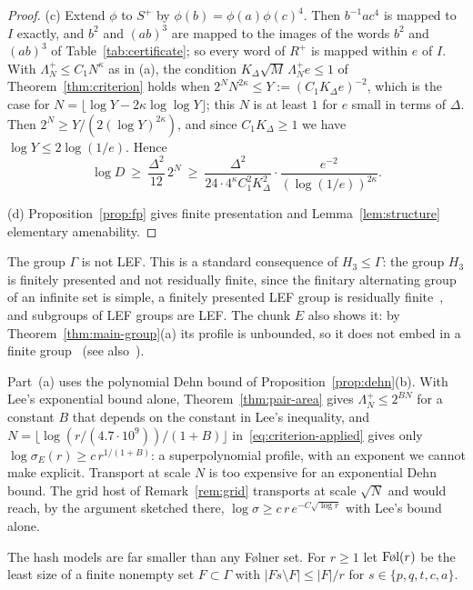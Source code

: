 \begin{proof}
(c) Extend $\phi$ to $S^+$ by $\phi(b)=\phi(a)\phi(c)^4$. Then $b^{-1}ac^4$ is mapped to $I$ exactly, and $b^2$ and $(ab)^3$ are mapped to the
images of the words $b^2$ and $(ab)^3$ of Table~\ref{tab:certificate}; so every word of $R^+$ is mapped within $e$ of $I$. With
$\Lambda^+_N\le C_1N^\kappa$ as in (a), the condition $K_\Delta\sqrt M\,\Lambda^+_Ne\le1$ of Theorem~\ref{thm:criterion} holds when
$2^NN^{2\kappa}\le Y:=(C_1K_\Delta e)^{-2}$, which is the case for $N=\lfloor\log Y-2\kappa\log\log Y\rfloor$; this $N$ is at least $1$ for $e$ small
in terms of $\Delta$. Then $2^N\ge Y/(2(\log Y)^{2\kappa})$, and since $C_1K_\Delta\ge1$ we have $\log Y\le2\log(1/e)$. Hence
\[
\log D\ \ge\ \frac{\Delta^2}{12}\,2^N\ \ge\ \frac{\Delta^2}{24\cdot4^\kappa C_1^2K_\Delta^2}\cdot\frac{e^{-2}}{(\log(1/e))^{2\kappa}}.
\]

(d) Proposition~\ref{prop:fp} gives finite presentation and Lemma~\ref{lem:structure} elementary amenability.
\end{proof}

The group $\Gamma$ is not LEF. This is a standard consequence of $H_3\le\Gamma$: the group $H_3$ is finitely presented and not residually finite,
since the finitary alternating group of an infinite set is simple, a finitely presented LEF group is residually finite~\cite{VershikGordon1997},
and subgroups of LEF groups are LEF. The chunk $E$ also shows it: by Theorem~\ref{thm:main-group}(a) its profile is unbounded, so it does not
embed in a finite group~\cite[Fact~3.5]{Cornulier2013} (see also~\cite[Lemma~2.1]{DouglasMghirbiA}).

\begin{remark}\label{rem:lee}
Part~(a) uses the polynomial Dehn bound of Proposition~\ref{prop:dehn}(b). With Lee's exponential bound alone, Theorem~\ref{thm:pair-area} gives
$\Lambda^+_N\le2^{BN}$ for a constant $B$ that depends on the constant in Lee's inequality, and $N=\lfloor\log(r/(4.7\cdot10^9))/(1+B)\rfloor$
in~\eqref{eq:criterion-applied} gives only $\log\sigma_E(r)\ge c\,r^{1/(1+B)}$: a superpolynomial profile, with an exponent we cannot make
explicit. Transport at scale $N$ is too expensive for an exponential Dehn bound. The grid host of Remark~\ref{rem:grid} transports at scale
$\sqrt N$ and would reach, by the argument sketched there, $\log\sigma\ge c\,r\,e^{-C\sqrt{\log r}}$ with Lee's bound alone.
\end{remark}

The hash models are far smaller than any Følner set. For $r\ge1$ let $\textup{Føl}(r)$ be the least size of a finite nonempty set
$F\subset\Gamma$ with $|Fs\setminus F|\le|F|/r$ for $s\in\{p,q,t,c,a\}$.

